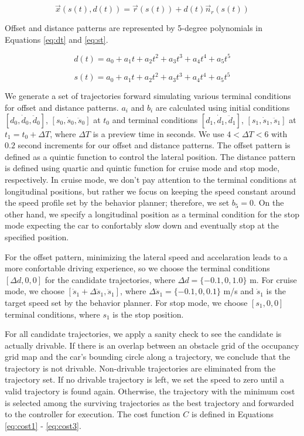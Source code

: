 \begin{equation}
  \vec{x}(s(t), d(t)) = \vec{r}(s(t)) + d(t)\vec{n}_r(s(t))
  \label{eq:trajectory}
\end{equation}

Offset and distance patterns are represented by 5-degree polynomials
in Equations \eqref{eq:dt} and \eqref{eq:st}.

\begin{equation}
  d(t) = a_0 + a_1t + a_2t^2 + a_3t^3 + a_4t^4 + a_5t^5
  \label{eq:dt}
\end{equation}

\begin{equation}
  s(t) = a_0 + a_1t + a_2t^2 + a_3t^3 + a_4t^4 + a_5t^5
  \label{eq:st}
\end{equation}

We generate a set of trajectories forward simulating various terminal
conditions for offset and distance patterns. $a_i$ and $b_i$ are calculated
using initial conditions $[d_0, \dot{d}_0, \ddot{d}_0]$, $[s_0, \dot{s}_0,
\ddot{s}_0]$ at $t_0$ and terminal conditions $[d_1, \dot{d}_1, \ddot{d}_1]$,
$[s_1, \dot{s}_1, \ddot{s}_1]$ at $t_1 = t_0 + \Delta T$, where $\Delta T$ is a
preview time in seconds. We use $4 < \Delta T < 6$ with $0.2$ second increments
for our offset and distance patterns. The offset pattern is defined as a
quintic function to control the lateral position.  The distance pattern is
defined using quartic and quintic function for cruise mode and stop mode,
respectively. In cruise mode, we don't pay attention to the terminal conditions
at longitudinal positions, but rather we focus on keeping the speed constant
around the speed profile set by the behavior planner; therefore, we set $b_5 =
0$. On the other hand, we specify a longitudinal position as a terminal
condition for the stop mode expecting the car to confortably slow down and
eventually stop at the specified position.

For the offset pattern, minimizing the lateral speed and accelaration leads to
a more confortable driving experience, so  we choose the terminal conditions
$[\Delta d, 0, 0]$ for the candidate trajectories, where $\Delta d = \{-0.1, 0,
1.0\}$ m. For cruise mode, we choose $[\dot{s}_1 + \Delta \dot{s}_1,
\ddot{s}_1]$, where $\Delta \dot{s}_1 = \{-0.1, 0, 0.1\}$ m/s and $\dot{s}_1$
is the target speed set by the behavior planner. For stop mode, we choose
$[s_1, 0, 0]$ terminal conditions, where $s_1$ is the stop position.

For all candidate trajectories, we apply a sanity check to see the candidate is
actually drivable. If there is an overlap between an obstacle grid of the
occupancy grid map and the car's bounding circle along a trajectory, we
conclude that the trajectory is not drivable. Non-drivable trajectories are
eliminated from the trajectory set. If no drivable trajectory is left, we set
the speed to zero until a valid trajectory is found again. Otherwise, the
trajectory with the minimum cost is selected among the surviving trajectories
as the best trajectory and forwarded to the controller for execution.
The cost function $C$ is defined in Equations \eqref{eq:cost1} -
\eqref{eq:cost3}.


